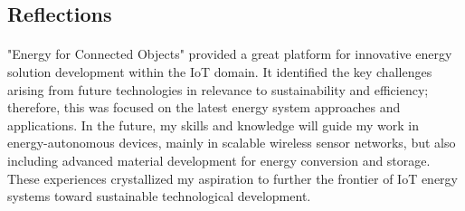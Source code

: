 \subsection{Reflections}
\paragraph{}"Energy for Connected Objects" provided a great platform for innovative energy solution development within the IoT domain. It identified the key challenges arising from future technologies in relevance to sustainability and efficiency; therefore, this was focused on the latest energy system approaches and applications. In the future, my skills and knowledge will guide my work in energy-autonomous devices, mainly in scalable wireless sensor networks, but also including advanced material development for energy conversion and storage. These experiences crystallized my aspiration to further the frontier of IoT energy systems toward sustainable technological development.